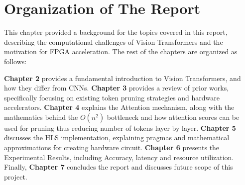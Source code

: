 \section{Organization of The Report}

This chapter provided a background for the topics covered in this report, describing the computational challenges of Vision Transformers and the motivation for FPGA acceleration. The rest of the chapters are organized as follows:

\textbf{Chapter 2} provides a fundamental introduction to Vision Transformers, and how they differ from CNNs.
\textbf{Chapter 3} provides a review of prior works, specifically focusing on existing token pruning strategies and hardware accelerators.
\textbf{Chapter 4} explains the Attention mechanism, along with the mathematics behind the $O(n^2)$ bottleneck and how attention scores can be used for pruning thus reducing number of tokens layer by layer.
\textbf{Chapter 5} discusses the HLS implementation, explaining pragmas and mathematical approximations for creating hardware circuit.
\textbf{Chapter 6} presents the Experimental Results, including Accuracy, latency and resource utilization.
Finally, \textbf{Chapter 7} concludes the report and discusses future scope of this project.
